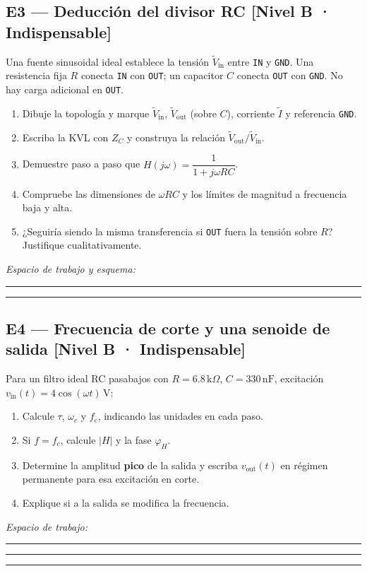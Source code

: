 \documentclass[11pt, a4paper]{article}
\newcommand{\phasor}[1]{\widetilde{#1}}
\begin{document}
\subsection*{E3 — Deducción del divisor RC \hfill \textnormal{\small [Nivel B · Indispensable]}}
Una fuente sinusoidal ideal establece la tensión $\phasor{V}_{\text{in}}$ entre \texttt{IN} y \texttt{GND}. Una resistencia fija $R$ conecta \texttt{IN} con \texttt{OUT}; un capacitor $C$ conecta \texttt{OUT} con \texttt{GND}. No hay carga adicional en \texttt{OUT}.
\begin{enumerate}\setlength\itemsep{0.15cm}
    \item[(a)] Dibuje la topología y marque $\phasor{V}_{\text{in}}$, $\phasor{V}_{\text{out}}$ (sobre $C$), corriente $\phasor{I}$ y referencia \texttt{GND}.
    \item[(b)] Escriba la KVL con $Z_C$ y construya la relación $\phasor{V}_{\text{out}}/\phasor{V}_{\text{in}}$.
    \item[(c)] Demuestre paso a paso que $H(j\omega) = \dfrac{1}{1 + j\omega RC}$.
    \item[(d)] Compruebe las dimensiones de $\omega RC$ y los límites de magnitud a frecuencia baja y alta.
    \item[(e)] ¿Seguiría siendo la misma transferencia si \texttt{OUT} fuera la tensión sobre $R$? Justifique cualitativamente.
\end{enumerate}
\noindent\textit{Espacio de trabajo y esquema:}\par\vspace{2.2cm}
\noindent\rule{\textwidth}{0.3pt}\par\vspace{0.45cm}
\noindent\rule{\textwidth}{0.3pt}

\subsection*{E4 — Frecuencia de corte y una senoide de salida \hfill \textnormal{\small [Nivel B · Indispensable]}}
Para un filtro ideal RC pasabajos con $R = 6.8\,\text{k}\Omega$, $C = 330\,\text{nF}$, excitación $v_{\text{in}}(t) = 4\cos(\omega t)\,\text{V}$:
\begin{enumerate}\setlength\itemsep{0.15cm}
    \item[(a)] Calcule $\tau$, $\omega_c$ y $f_c$, indicando las unidades en cada paso.
    \item[(b)] Si $f = f_c$, calcule $|H|$ y la fase $\varphi_H$.
    \item[(c)] Determine la amplitud \textbf{pico} de la salida y escriba $v_{\text{out}}(t)$ en régimen permanente para esa excitación en corte.
    \item[(d)] Explique si a la salida se modifica la frecuencia.
\end{enumerate}
\noindent\textit{Espacio de trabajo:}\par\vspace{0.35cm}
\noindent\rule{\textwidth}{0.3pt}\par\vspace{0.45cm}
\noindent\rule{\textwidth}{0.3pt}\par\vspace{0.45cm}
\noindent\rule{\textwidth}{0.3pt}
\end{document}
